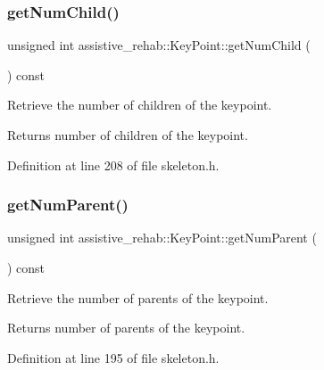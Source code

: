 \subsubsection{\texorpdfstring{getNumChild()}{getNumChild()}}
{\footnotesize\ttfamily unsigned int assistive\+\_\+rehab\+::\+Key\+Point\+::get\+Num\+Child (\begin{DoxyParamCaption}{ }\end{DoxyParamCaption}) const\hspace{0.3cm}{\ttfamily [inline]}}



Retrieve the number of children of the keypoint. 

\begin{DoxyReturn}{Returns}
number of children of the keypoint. 
\end{DoxyReturn}


Definition at line 208 of file skeleton.\+h.


\begin{DoxyCode}{0}

\end{DoxyCode}
\mbox{\label{classassistive__rehab_1_1KeyPoint_acf31a6d7e9ae1be4aa992599435564ad}} 
\subsubsection{\texorpdfstring{getNumParent()}{getNumParent()}}
{\footnotesize\ttfamily unsigned int assistive\+\_\+rehab\+::\+Key\+Point\+::get\+Num\+Parent (\begin{DoxyParamCaption}{ }\end{DoxyParamCaption}) const\hspace{0.3cm}{\ttfamily [inline]}}



Retrieve the number of parents of the keypoint. 

\begin{DoxyReturn}{Returns}
number of parents of the keypoint. 
\end{DoxyReturn}


Definition at line 195 of file skeleton.\+h.


\begin{DoxyCode}{0}

\end{DoxyCode}
\mbox{\label{classassistive__rehab_1_1KeyPoint_a0aa07ed9cc05471af65622fa05329cc3}} 
